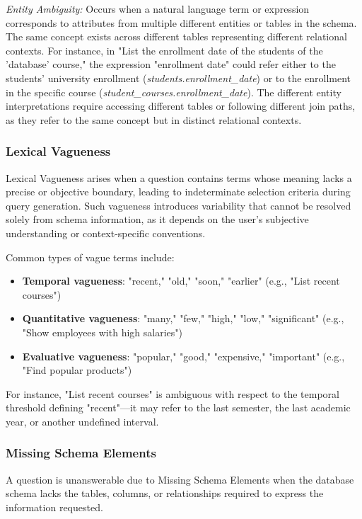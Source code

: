 \textit{Entity Ambiguity:} Occurs when a natural language term or expression corresponds to attributes from multiple different entities or tables in the schema. The same concept exists across different tables representing different relational contexts. For instance, in "List the enrollment date of the students of the 'database' course," the expression "enrollment date" could refer either to the students' university enrollment (\textit{students.enrollment\_date}) or to the enrollment in the specific course (\textit{student\_courses.enrollment\_date}). The different entity interpretations require accessing different tables or following different join paths, as they refer to the same concept but in distinct relational contexts.

\subsubsection{Lexical Vagueness}
Lexical Vagueness arises when a question contains terms whose meaning lacks a precise or objective boundary, leading to indeterminate selection criteria during query generation. Such vagueness introduces variability that cannot be resolved solely from schema information, as it depends on the user's subjective understanding or context-specific conventions.

Common types of vague terms include:
\begin{itemize}
    \item \textbf{Temporal vagueness}: "recent," "old," "soon," "earlier" (e.g., "List recent courses")
    \item \textbf{Quantitative vagueness}: "many," "few," "high," "low," "significant" (e.g., "Show employees with high salaries")
    \item \textbf{Evaluative vagueness}: "popular," "good," "expensive," "important" (e.g., "Find popular products")
\end{itemize}

For instance, "List recent courses" is ambiguous with respect to the temporal threshold defining "recent"—it may refer to the last semester, the last academic year, or another undefined interval.

\subsubsection{Missing Schema Elements}
A question is unanswerable due to Missing Schema Elements when the database schema lacks the tables, columns, or relationships required to express the information requested.

